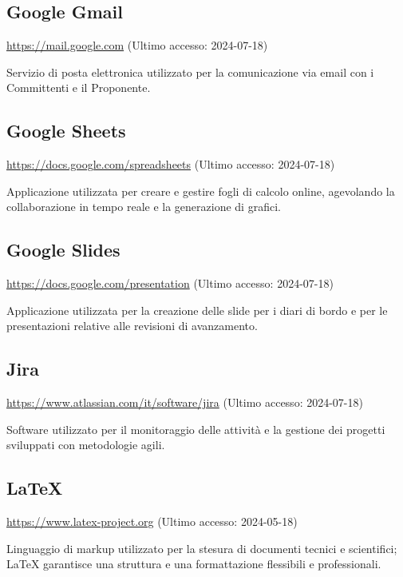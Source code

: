 \subsection{Google Gmail}
\par \href{https://mail.google.com}{https://mail.google.com} (Ultimo accesso: 2024-07-18)
\par Servizio di posta elettronica utilizzato per la comunicazione via email con i Committenti e il Proponente.

\subsection{Google Sheets}
\par \href{https://docs.google.com/spreadsheets}{https://docs.google.com/spreadsheets} (Ultimo accesso: 2024-07-18)
\par Applicazione utilizzata per creare e gestire fogli di calcolo online, agevolando la collaborazione in tempo reale e la generazione di grafici.

\subsection{Google Slides}
\par \href{https://docs.google.com/presentation}{https://docs.google.com/presentation} (Ultimo accesso: 2024-07-18)
\par Applicazione utilizzata per la creazione delle slide per i diari di bordo e per le presentazioni relative alle revisioni di avanzamento.
    
\subsection{Jira}
\par \href{https://www.atlassian.com/it/software/jira}{https://www.atlassian.com/it/software/jira} (Ultimo accesso: 2024-07-18)
\par Software utilizzato per il monitoraggio delle attività e la gestione dei progetti sviluppati con metodologie agili.
    
\subsection{LaTeX}
\par \href{https://www.latex-project.org}{https://www.latex-project.org} (Ultimo accesso: 2024-05-18)
\par Linguaggio di markup utilizzato per la stesura di documenti tecnici e scientifici; LaTeX garantisce una struttura e una formattazione flessibili e professionali.
    
